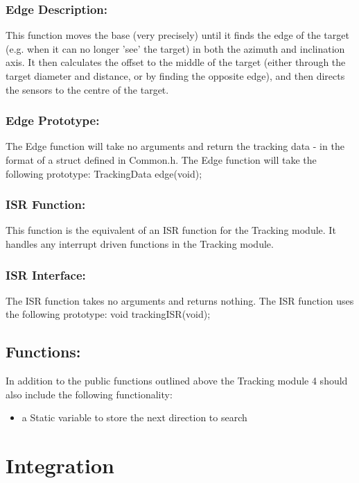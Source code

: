 \documentclass[]{article}
\begin{document}
\subsubsection{Edge Description:}
This function moves the base (very precisely) until it finds the edge of the target (e.g. when it can no longer 'see' the target) in both the azimuth and inclination axis. It then calculates the offset to the middle of the target (either through the target diameter and distance, or by finding the opposite edge), and then directs the sensors to the centre of the target.

\subsubsection{Edge Prototype:}
The Edge function will take no arguments and return the tracking data - in the format of a struct defined in Common.h. The Edge function will take the following prototype: \newline \newline
TrackingData edge(void);

\subsubsection{ISR Function:}
This function is the equivalent of an ISR function for the Tracking module. It handles any interrupt driven functions in the Tracking module.

\subsubsection{ISR Interface:}
The ISR function takes no arguments and returns nothing. The ISR function uses the following prototype: \newline \newline
void trackingISR(void);

\subsection{Functions:}
In addition to the public functions outlined above the Tracking module 4	should also include the following functionality:
\begin{itemize}
	\item a Static variable to store the next direction to search
\end{itemize}

\newpage
\section{Integration}
\end{document}
